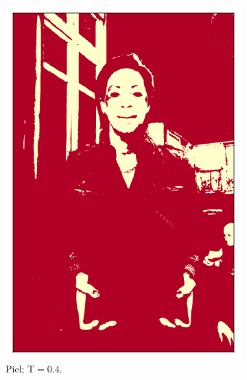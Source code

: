 \begin{figure}[ht!]
\begin{subfigure}[t]{0.2\textwidth}
        \includegraphics[width=\textwidth]{../figures/image2/image_02_treshskin_40percent.png}
        \caption{Piel; $\text{T} = 0.4$.}
    \end{subfigure}
    \hspace{0.25cm}
    \begin{subfigure}[t]{0.2\textwidth}
        \centering

\end{subfigure}
\end{figure}
